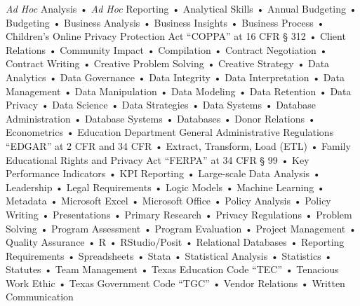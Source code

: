 \documentclass[
  11pt,
]
{article}
\begin{document}
\emph{Ad Hoc} Analysis • \emph{Ad Hoc} Reporting • Analytical Skills •
Annual Budgeting • Budgeting • Business Analysis • Business Insights •
Business Process • Children's Online Privacy Protection Act ``COPPA'' at
16 CFR § 312 • Client Relations • Community Impact • Compilation •
Contract Negotiation • Contract Writing • Creative Problem Solving •
Creative Strategy • Data Analytics • Data Governance • Data Integrity •
Data Interpretation • Data Management • Data Manipulation • Data
Modeling • Data Retention • Data Privacy • Data Science • Data
Strategies • Data Systems • Database Administration • Database Systems •
Databases • Donor Relations • Econometrics • Education Department
General Administrative Regulations ``EDGAR'' at 2 CFR and 34 CFR •
Extract, Transform, Load (ETL) • Family Educational Rights and Privacy
Act ``FERPA'' at 34 CFR § 99 • Key Performance Indicators • KPI
Reporting • Large-scale Data Analysis • Leadership • Legal Requirements
• Logic Models • Machine Learning • Metadata • Microsoft Excel •
Microsoft Office • Policy Analysis • Policy Writing • Presentations •
Primary Research • Privacy Regulations • Problem Solving • Program
Assessment • Program Evaluation • Project Management • Quality Assurance
• R • RStudio/Posit • Relational Databases • Reporting Requirements •
Spreadsheets • Stata • Statistical Analysis • Statistics • Statutes •
Team Management • Texas Education Code ``TEC'' • Tenacious Work Ethic •
Texas Government Code ``TGC'' • Vendor Relations • Written Communication
\end{document}
